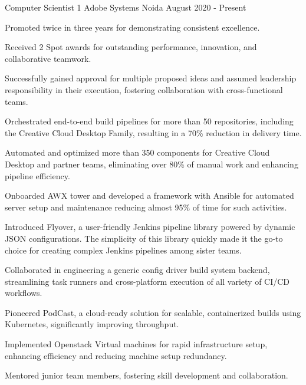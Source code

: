 

\begin{cventries}

\cventry
    {Computer Scientist 1} %
    {Adobe Systems} %
    {Noida} %
    {August 2020 - Present} %
    {
    \begin{cvitems}
        \item Promoted twice in three years for demonstrating consistent excellence.
        \item Received 2 Spot awards for outstanding performance, innovation, and collaborative teamwork.
        \item Successfully gained approval for multiple proposed ideas and assumed leadership responsibility in their execution, fostering collaboration with cross-functional teams.
        \item Orchestrated end-to-end build pipelines for more than 50 repositories, including the Creative Cloud Desktop Family, resulting in a 70\% reduction in delivery time.
        \item Automated and optimized more than 350 components for Creative Cloud Desktop and partner teams, eliminating over 80\% of manual work and enhancing pipeline efficiency.
        \item Onboarded AWX tower and developed a framework with Ansible for automated server setup and maintenance reducing almost 95\% of time for such activities.
        \item Introduced Flyover, a user-friendly Jenkins pipeline library powered by dynamic JSON configurations. The simplicity of this library quickly made it the go-to choice for creating complex Jenkins pipelines among sister teams.
        \item Collaborated in engineering a generic config driver build system backend, streamlining task runners and cross-platform execution of all variety of CI/CD workflows.
        \item Pioneered PodCast, a cloud-ready solution for scalable, containerized builds using Kubernetes, significantly improving throughput.
        \item Implemented Openstack Virtual machines for rapid infrastructure setup, enhancing efficiency and reducing machine setup redundancy.
        \item Mentored junior team members, fostering skill development and collaboration.
    \end{cvitems}
    }


\end{cventries}
